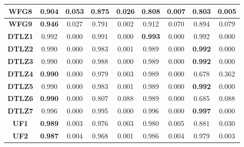 \begin{table*}[t]
\begin{tabular}{cc|c|c|c|c|c|c|c}
\multicolumn{1}{c|}{\textbf{WFG8}}  & \multicolumn{1}{c|}{\textbf{0.904}} & 0.053        & 0.875             & 0.026           & 0.808              & 0.007           & 0.803              & 0.005            \\ \hline
\multicolumn{1}{c|}{\textbf{WFG9}}  & \multicolumn{1}{c|}{\textbf{0.946}} & 0.027        & 0.791             & 0.002           & 0.912              & 0.070           & 0.894              & 0.079            \\ \hline
\multicolumn{1}{c|}{\textbf{DTLZ1}} & \multicolumn{1}{c|}{0.992}          & 0.000        & 0.991             & 0.000           & \textbf{0.993}     & 0.000           & 0.992              & 0.000            \\ \hline
\multicolumn{1}{c|}{\textbf{DTLZ2}} & \multicolumn{1}{c|}{0.990}          & 0.000        & 0.983             & 0.001           & 0.989              & 0.000           & \textbf{0.992}     & 0.000            \\ \hline
\multicolumn{1}{c|}{\textbf{DTLZ3}} & \multicolumn{1}{c|}{0.990}          & 0.000        & 0.988             & 0.000           & 0.989              & 0.000           & \textbf{0.992}     & 0.000            \\ \hline
\multicolumn{1}{c|}{\textbf{DTLZ4}} & \multicolumn{1}{c|}{\textbf{0.990}} & 0.000        & 0.979             & 0.003           & 0.989              & 0.000           & 0.678              & 0.362            \\ \hline
\multicolumn{1}{c|}{\textbf{DTLZ5}} & \multicolumn{1}{c|}{0.990}          & 0.000        & 0.983             & 0.001           & 0.989              & 0.000           & \textbf{0.992}     & 0.000            \\ \hline
\multicolumn{1}{c|}{\textbf{DTLZ6}} & \multicolumn{1}{c|}{\textbf{0.990}} & 0.000        & 0.807             & 0.088           & 0.989              & 0.000           & 0.685              & 0.088            \\ \hline
\multicolumn{1}{c|}{\textbf{DTLZ7}} & \multicolumn{1}{c|}{0.996}          & 0.000        & 0.995             & 0.000           & 0.996              & 0.000           & \textbf{0.997}     & 0.000            \\ \hline
\multicolumn{1}{c|}{\textbf{UF1}}   & \multicolumn{1}{c|}{\textbf{0.989}} & 0.003        & 0.976             & 0.003           & 0.980              & 0.005           & 0.881              & 0.030            \\ \hline
\multicolumn{1}{c|}{\textbf{UF2}}   & \multicolumn{1}{c|}{\textbf{0.987}} & 0.004        & 0.968             & 0.001           & 0.986              & 0.004           & 0.979              & 0.003            \\ \hline

\end{tabular}
\end{table*}
